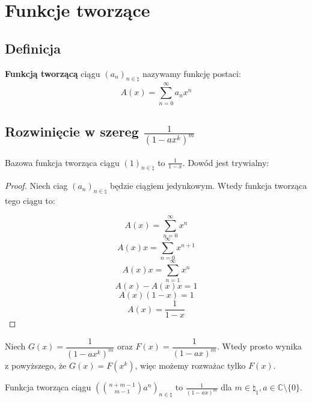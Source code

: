\section{Funkcje tworzące}

\subsection{Definicja}

\begin{definition}
    \textbf{Funkcją tworzącą} ciągu \((a_n)_{n \in \natural}\) nazywamy funkcję postaci:
    \begin{equation*}
        A(x) = \sum_{n=0}^{\infty} a_n x^n
    \end{equation*}
\end{definition}

\subsection{Rozwinięcie w szereg \(\frac{1}{(1-ax^k)^m}\)}

Bazowa funkcja tworząca ciągu \((1)_{n \in \natural}\) to \(\frac{1}{1-x}\). Dowód jest trywialny:

\begin{proof}
    Niech ciag \((a_n)_{n \in \natural}\) będzie ciągiem jedynkowym. Wtedy funkcja tworząca tego ciągu to:

    $$ A(x) = \sum_{n=0}^{\infty} x^n $$
    $$ A(x) x = \sum_{n=0}^{\infty} x^{n+1} $$
    $$ A(x) x = \sum_{n=1}^{\infty} x^n $$
    $$ A(x) - A(x) x = 1 $$
    $$ A(x) (1 - x) = 1 $$
    $$ A(x) = \dfrac{1}{1-x} $$
\end{proof}

Niech $G(x) = \dfrac{1}{(1-ax^k)^m}$ oraz $F(x) = \dfrac{1}{(1-ax)^m}$. Wtedy prosto wynika z powyższego, że $G(x) = F(x^k)$, więc możemy rozważac tylko $F(x)$.

\begin{lemma}
    Funkcja tworząca ciągu \((\binom{n+m-1}{m-1} a^n )_{n \in \natural}\) to \(\frac{1}{(1-ax)^m}\) dla \( m \in \natural_1, a \in \mathbb{C} \setminus \{0\} \).
\end{lemma}

